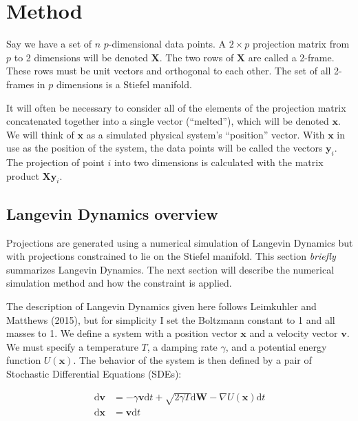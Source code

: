 \hypertarget{method}{%
\section{Method}\label{method}}

Say we have a set of \(n\) \(p\)-dimensional data points. A \(2 \times p\) projection matrix from \(p\) to 2 dimensions will be denoted \(\mathbf X\). The two rows of \(\mathbf X\) are called a 2-frame. These rows must be unit vectors and orthogonal to each other. The set of all 2-frames in \(p\) dimensions is a Stiefel manifold.

It will often be necessary to consider all of the elements of the projection matrix concatenated together into a single vector (``melted''), which will be denoted \(\mathbf x\). We will think of \(\mathbf x\) as a simulated physical system's ``position'' vector. With \(\mathbf x\) in use as the position of the system, the data points will be called the vectors \(\mathbf y_i\). The projection of point \(i\) into two dimensions is calculated with the matrix product \(\mathbf X \mathbf y_i\).

\hypertarget{langevindynamics}{%
\subsection{Langevin Dynamics overview}\label{langevindynamics}}

Projections are generated using a numerical simulation of Langevin Dynamics but with projections constrained to lie on the Stiefel manifold. This section \emph{briefly} summarizes Langevin Dynamics. The next section will describe the numerical simulation method and how the constraint is applied.

The description of Langevin Dynamics given here follows Leimkuhler and Matthews (2015), but for simplicity I set the Boltzmann constant to 1 and all masses to 1. We define a system with a position vector \(\mathbf x\) and a velocity vector \(\mathbf v\). We must specify a temperature \(T\), a damping rate \(\gamma\), and a potential energy function \(U(\mathbf x)\). The behavior of the system is then defined by a pair of Stochastic Differential Equations (SDEs):

\begin{align}
\mathrm{d}\mathbf{v} &= 
    -\gamma \mathbf{v} \mathrm{d}t 
    + \sqrt{2\gamma T}\mathrm{d}\mathbf{W} 
    -\nabla U(\mathbf{x}) \mathrm{d}t
    \label{eq:dv}\\
\mathrm{d}\mathbf{x} &= \mathbf{v} \mathrm{d}t
    \label{eq:dx}
\end{align}


